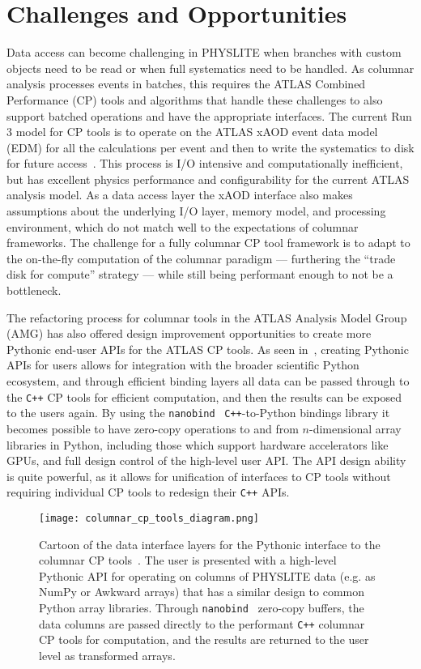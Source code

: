 \section{Challenges and Opportunities}\label{sec:challenges}

Data access can become challenging in PHYSLITE when branches with custom objects need to be read or when full systematics need to be handled.
As columnar analysis processes events in batches, this requires the ATLAS Combined Performance (CP) tools and algorithms that handle these challenges to also support batched operations and have the appropriate interfaces.
The current Run 3 model for CP tools is to operate on the ATLAS xAOD event data model (EDM) for all the calculations per event and then to write the systematics to disk for future access~\cite{SOFT-2022-02}.
This process is I/O intensive and computationally inefficient, but has excellent physics performance and configurability for the current ATLAS analysis model.
As a data access layer the xAOD interface also makes assumptions about the underlying I/O layer, memory model, and processing environment, which do not match well to the expectations of columnar frameworks.
The challenge for a fully columnar CP tool framework is to adapt to the on-the-fly computation of the columnar paradigm --- furthering the ``trade disk for compute'' strategy --- while still being performant enough to not be a bottleneck.

The refactoring process for columnar tools in the ATLAS Analysis Model Group (AMG) has also offered design improvement opportunities to create more Pythonic end-user APIs for the ATLAS CP tools.
As seen in~, creating Pythonic APIs for users allows for integration with the broader scientific Python ecosystem, and through efficient binding layers all data can be passed through to the \texttt{C++} CP tools for efficient computation, and then the results can be exposed to the users again.
By using the \texttt{nanobind}~\cite{nanobind} \texttt{C++}-to-Python bindings library it becomes possible to have zero-copy operations to and from $n$-dimensional array libraries in Python, including those which support hardware accelerators like GPUs, and full design control of the high-level user API.
The API design ability is quite powerful, as it allows for unification of interfaces to CP tools without requiring individual CP tools to redesign their \texttt{C++} APIs.

\begin{figure}
    \centering
    \texttt{[image: columnar\_cp\_tools\_diagram.png]}
    \caption{Cartoon of the data interface layers for the Pythonic interface to the columnar CP tools~\cite{Vigl:ACAT_2024}.
The user is presented with a high-level Pythonic API for operating on columns of PHYSLITE data (e.g. as NumPy or Awkward arrays) that has a similar design to common Python array libraries.
Through \texttt{nanobind}~\cite{nanobind} zero-copy buffers, the data columns are passed directly to the performant \texttt{C++} columnar CP tools for computation, and the results are returned to the user level as transformed arrays.}
    \label{fig:columnar_cp_tools_diagram}
\end{figure}
